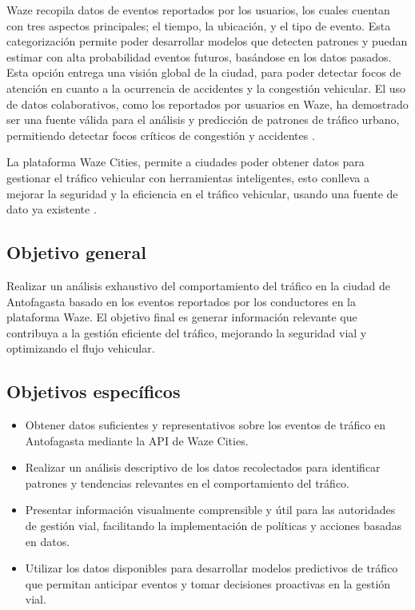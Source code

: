 \documentclass[12pt]{article}
\begin{document}
Waze recopila datos de eventos reportados por los usuarios, los cuales cuentan con tres aspectos principales; el tiempo, la ubicación, y el tipo de evento. Esta categorización permite poder desarrollar modelos que detecten patrones y puedan estimar con alta probabilidad eventos futuros, basándose en los datos pasados. Esta opción entrega una visión global de la ciudad, para poder detectar focos de atención en cuanto a la ocurrencia de accidentes y la congestión vehicular. El uso de datos colaborativos, como los reportados por usuarios en Waze, ha demostrado ser una fuente válida para el análisis y predicción de patrones de tráfico urbano, permitiendo detectar focos críticos de congestión y accidentes \citep{ferreira2017waze}.

La plataforma Waze Cities, permite a ciudades poder obtener datos para gestionar el tráfico vehicular con herramientas inteligentes, esto conlleva a mejorar la seguridad y la eficiencia en el tráfico vehicular, usando una fuente de dato ya existente \citep{wazecitiescasestudies2024}.

\subsection{Objetivo general}

Realizar un análisis exhaustivo del comportamiento del tráfico en la ciudad de Antofagasta basado en los eventos reportados por los conductores en la plataforma Waze. El objetivo final es generar información relevante que contribuya a la gestión eficiente del tráfico, mejorando la seguridad vial y optimizando el flujo vehicular.

\subsection{Objetivos específicos}

\begin{itemize}
    \item Obtener datos suficientes y representativos sobre los eventos de tráfico en Antofagasta mediante la API de Waze Cities.
    \item Realizar un análisis descriptivo de los datos recolectados para identificar patrones y tendencias relevantes en el comportamiento del tráfico.
    \item Presentar información visualmente comprensible y útil para las autoridades de gestión vial, facilitando la implementación de políticas y acciones basadas en datos.
    \item Utilizar los datos disponibles para desarrollar modelos predictivos de tráfico que permitan anticipar eventos y tomar decisiones proactivas en la gestión vial.
\end{itemize}
\end{document}
